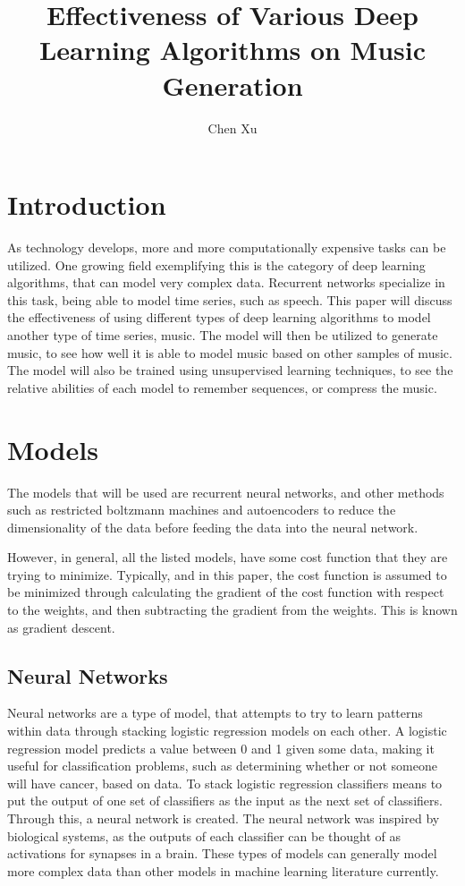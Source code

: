 \documentclass{article}
\begin{document}
\author{Chen Xu}
\title{Effectiveness of Various Deep Learning Algorithms on Music Generation}
\maketitle

\section{Introduction}
As technology develops, more and more computationally expensive tasks can be
utilized. One growing field exemplifying this is the category of deep learning
algorithms, that can model very complex data.  Recurrent networks specialize in
this task, being able to model time series, such as speech. This paper will
discuss the effectiveness of using different types of deep learning algorithms
to model another type of time series, music. The model will then be utilized to
generate music, to see how well it is able to model music based on other samples
of music. The model will also be trained using unsupervised learning techniques,
to see the relative abilities of each model to remember sequences, or compress
the music.

\section{Models}
The models that will be used are recurrent neural networks, and other methods
such as restricted boltzmann machines and autoencoders to reduce the
dimensionality of the data before feeding the data into the neural network.

However, in general, all the listed models, have some cost function that they
are trying to minimize. Typically, and in this paper, the cost function is
assumed to be minimized through calculating the gradient of the cost function
with respect to the weights, and then subtracting the gradient from the weights.
This is known as gradient descent.

\subsection{Neural Networks}
Neural networks are a type of model, that attempts to try to learn patterns
within data through stacking logistic regression models on each other. A
logistic regression model predicts a value between 0 and 1 given some data,
making it useful for classification problems, such as determining whether or not
someone will have cancer, based on data. To stack logistic regression
classifiers means to put the output of one set of classifiers as the input as
the next set of classifiers. Through this, a neural network is created. The
neural network was inspired by biological systems, as the outputs of each
classifier can be thought of as activations for synapses in a brain. These types
of models can generally model more complex data than other models in machine
learning literature currently.
\end{document}
